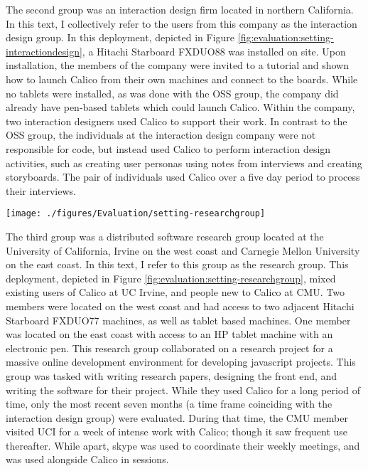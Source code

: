 The second group was an interaction design firm located in northern California. In this text, I collectively refer to the users from this company as the interaction design group. In this deployment, depicted in Figure \ref{fig:evaluation:setting-interactiondesign}, a Hitachi Starboard FXDUO88 was installed on site. Upon installation, the members of the company were invited to a tutorial and shown how to launch Calico from their own machines and connect to the boards. While no tablets were installed, as was done with the OSS group, the company did already have pen-based tablets which could launch Calico. Within the company, two interaction designers used Calico to support their work. In contrast to the OSS group, the individuals at the interaction design company were not responsible for code, but instead used Calico to perform interaction design activities, such as creating user personas using notes from interviews and creating storyboards. The pair of individuals used Calico over a five day period to process their interviews.

\begin{figure*}[tbh]
  \centering
  \texttt{[image: ./figures/Evaluation/setting-researchgroup]}
  \caption{The physical setup of the research group}
  \label{fig:evaluation:setting-researchgroup}
\end{figure*}

The third group was a distributed software research group located at the University of California, Irvine on the west coast and Carnegie Mellon University on the east coast. In this text, I refer to this group as the research group. This deployment, depicted in Figure \ref{fig:evaluation:setting-researchgroup}, mixed existing users of Calico at UC Irvine, and people new to Calico at CMU. Two members were located on the west coast and had access to two adjacent Hitachi Starboard FXDUO77 machines, as well as tablet based machines. One member was located on the east coast with access to an HP tablet machine with an electronic pen. This research group collaborated on a research project for a massive online development environment for developing javascript projects. This group was tasked with writing research papers, designing the front end, and writing the software for their project. While they used Calico for a long period of time, only the most recent seven months (a time frame coinciding with the interaction design group) were evaluated. During that time, the CMU member visited UCI for a week of intense work with Calico; though it saw frequent use thereafter. While apart, skype was used to coordinate their weekly meetings, and was used alongside Calico in sessions.

